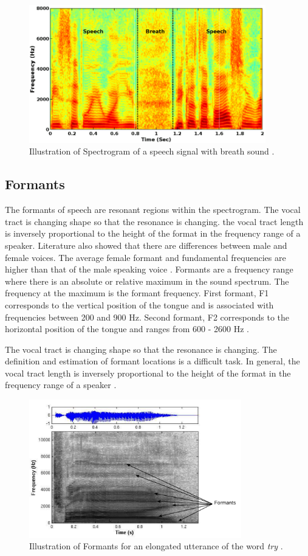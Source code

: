 \begin{figure}[htbp!]
    \centering
    \includegraphics[height=6cm]{figures/spectogram.png}
    \caption{Illustration of Spectrogram of a speech signal with breath sound \cite{inproceedings}.}
    \label{fig:spectrogram}
\end{figure}


\subsection{Formants}
The formants of speech are resonant regions within the spectrogram. The vocal tract is changing shape so that the resonance is changing. the vocal tract length is inversely proportional to the height of the format in the frequency range of a speaker. Literature also showed that there are differences between male and female voices. The average female formant and fundamental frequencies are higher than that of the male speaking voice \cite{wu1991gender}. Formants are a frequency range where there is an absolute or relative maximum in the sound spectrum. The frequency at the maximum is the formant frequency\cite{pierce2019acoustics}. First formant, F1 corresponds to the vertical position of the tongue and is associated with frequencies between 200 and 900 Hz. Second formant, F2 corresponds to the horizontal position of the tongue and ranges from 600 - 2600 Hz \cite{watson1998acoustic}.

The vocal tract is changing shape so that the resonance is changing. The definition and estimation of formant locations is a difficult task. In general, the vocal tract length is inversely proportional to the height of the format in the frequency range of a speaker \cite{beigi2011speaker}.

\begin{figure}[htbp!]
    \centering
    \includegraphics[height=6cm]{figures/formants.png}
    \caption{Illustration of Formants for an elongated utterance of the word \textit{try} \cite{beigi2011speaker}.}
    \label{fig:formants}
\end{figure}


